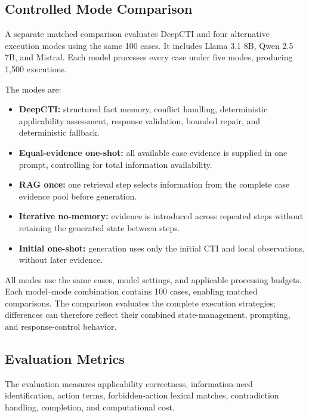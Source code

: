 \documentclass[conference]{IEEEtran}
\begin{document}
\subsection{Controlled Mode Comparison}

A separate matched comparison evaluates DeepCTI and four alternative
execution modes using the same 100 cases. It includes Llama 3.1 8B,
Qwen 2.5 7B, and Mistral. Each model processes every case under five
modes, producing 1,500 executions.

The modes are:
\begin{itemize}
    \item \textbf{DeepCTI:} structured fact memory, conflict handling,
    deterministic applicability assessment, response validation,
    bounded repair, and deterministic fallback.

    \item \textbf{Equal-evidence one-shot:} all available case evidence
    is supplied in one prompt, controlling for total information
    availability.

    \item \textbf{RAG once:} one retrieval step selects information
    from the complete case evidence pool before generation.

    \item \textbf{Iterative no-memory:} evidence is introduced across
    repeated steps without retaining the generated state between
    steps.

    \item \textbf{Initial one-shot:} generation uses only the initial
    CTI and local observations, without later evidence.
\end{itemize}

All modes use the same cases, model settings, and applicable processing
budgets. Each model--mode combination contains 100 cases, enabling
matched comparisons. The comparison evaluates the complete execution
strategies; differences can therefore reflect their combined
state-management, prompting, and response-control behavior.

\subsection{Evaluation Metrics}

The evaluation measures applicability correctness, information-need
identification, action terms, forbidden-action lexical matches,
contradiction handling, completion, and computational cost.
\end{document}
